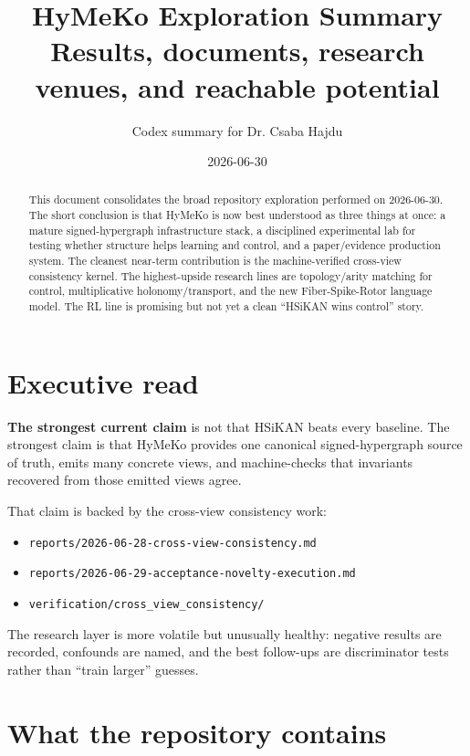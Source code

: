 \documentclass[11pt]{article}
\title{\textbf{HyMeKo Exploration Summary}\\[3pt]
\large Results, documents, research venues, and reachable potential}
\author{Codex summary for Dr. Csaba Hajdu}
\date{2026-06-30}
\newcommand{\pathref}[1]{\nolinkurl{#1}}
\begin{document}
\maketitle

\begin{abstract}
This document consolidates the broad repository exploration performed on
2026-06-30. The short conclusion is that HyMeKo is now best understood as three
things at once: a mature signed-hypergraph infrastructure stack, a disciplined
experimental lab for testing whether structure helps learning and control, and
a paper/evidence production system. The cleanest near-term contribution is the
machine-verified cross-view consistency kernel. The highest-upside research
lines are topology/arity matching for control, multiplicative holonomy/transport,
and the new Fiber-Spike-Rotor language model. The RL line is promising but not
yet a clean ``HSiKAN wins control'' story.
\end{abstract}

\section{Executive read}

\textbf{The strongest current claim} is not that HSiKAN beats every baseline.
The strongest claim is that HyMeKo provides one canonical signed-hypergraph
source of truth, emits many concrete views, and machine-checks that invariants
recovered from those emitted views agree.

That claim is backed by the cross-view consistency work:
\begin{itemize}[nosep]
  \item \pathref{reports/2026-06-28-cross-view-consistency.md}
  \item \pathref{reports/2026-06-29-acceptance-novelty-execution.md}
  \item \pathref{verification/cross_view_consistency/}
\end{itemize}

The research layer is more volatile but unusually healthy: negative results are
recorded, confounds are named, and the best follow-ups are discriminator tests
rather than ``train larger'' guesses.

\section{What the repository contains}
\end{document}
